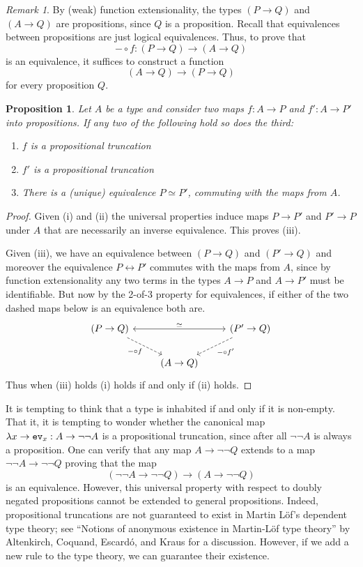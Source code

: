 \documentclass{amsart}
\theoremstyle{theorem}
\newtheorem*{prop}{Proposition}
\theoremstyle{definition}
\theoremstyle{remark}
\newtheorem*{rmk}{Remark}
\newcommand{\0}{\mathbbe{0}}
\newcommand{\1}{\mathbbe{1}}
\newcommand{\2}{\mathbbe{2}}
\newcommand{\3}{\mathbbe{3}}
\newcommand{\4}{\mathbbe{4}}
\newcommand{\term}[1]{{\textup{\texttt{#1}}}}
\newcommand{\ev}{\term{ev}}
\begin{document}
\begin{rmk} By (weak) function extensionality, the types $(P \to Q)$ and $(A \to Q)$ are propositions, since $Q$ is a proposition. Recall that equivalences between propositions are just logical equivalences. Thus, to prove that \[ - \circ f : (P \to Q) \to (A \to Q)\] is an equivalence, it suffices to construct a function 
\[  (A \to Q) \to (P \to Q)\]
for every proposition $Q$.
\end{rmk}

\begin{prop} Let $A$ be a type and consider two maps $f\colon A \to P$ and $f' \colon A \to P'$ into propositions. If any two of the following hold so does the third:
\begin{enumerate}
\item $f$ is a propositional truncation
\item $f'$ is a propositional truncation
\item There is a (unique) equivalence $P \simeq P'$, commuting with the maps from $A$.
\end{enumerate}
\end{prop}
\begin{proof}
Given (i) and (ii) the universal properties induce maps $P \to P'$ and $P' \to P$ under $A$ that are necessarily an inverse equivalence. This proves (iii). 

Given (iii), we have an equivalence between $(P \to Q)$ and $(P' \to Q)$ and moreover the equivalence $P \leftrightarrow P'$ commutes with the maps from $A$, since by function extensionality any two terms in the types $A \to P$ and $A \to P'$ must be identifiable. But now by the 2-of-3 property for equivalences, if either of the two dashed maps below is an equivalence both are. 
\[
\begin{tikzcd}  (P \to Q) \arrow[rr, leftrightarrow, "\simeq"] \arrow[dr, dashed, "- \circ f"']& & (P' \to Q) \arrow[dl, dashed, "- \circ f'"] \\ & (A \to Q) 
\end{tikzcd}
\] 
Thus when (iii) holds (i) holds if and only if (ii) holds.
\end{proof}

It is tempting to think that a type is inhabited if and only if it is non-empty. That it, it is tempting to wonder whether the canonical map $\lambda x \to \ev_x : A \to \neg\neg A$ is a propositional truncation, since after all $\neg\neg A$ is always a proposition. One can verify that any map $A \to \neg\neg Q$ extends to a map $\neg\neg A \to \neg\neg Q$ proving that the map
\[ (\neg\neg A \to \neg\neg Q) \to (A \to \neg\neg Q)\]
is an equivalence. However, this universal property with respect to doubly negated propositions cannot be extended to general propositions. Indeed, propositional truncations are not guaranteed to exist in Martin L\"{o}f's dependent type theory; see ``Notions of anonymous existence in Martin-L\"{o}f type theory'' by Altenkirch, Coquand, Escard\'{o}, and Kraus for a discussion. However, if we add a new rule to the type theory, we can guarantee their existence.
\end{document}
